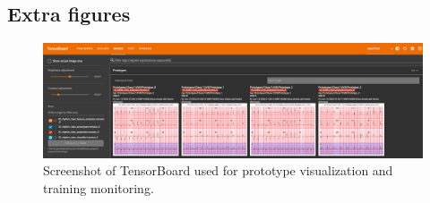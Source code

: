 \onecolumn
\newpage
\appendix

\begin{appendices}

\section{Extra figures}

\begin{figure}[h]
    \centering
    \includegraphics[width=0.9\linewidth]{images/tensorboard.png}
    \caption{Screenshot of TensorBoard used for prototype visualization and training monitoring.}
    \label{fig:tensorboard}
\end{figure}

\end{appendices}